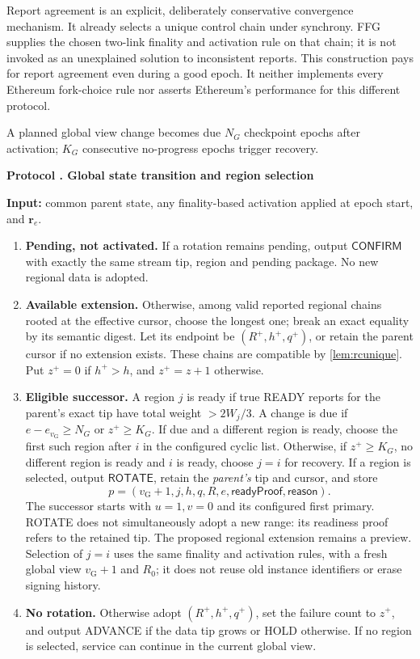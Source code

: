 \documentclass[11pt,a4paper,onecolumn]{article}
\newcommand{\gv}{v_{\mathrm G}}
\newcommand{\Tag}[1]{\mathsf{#1}}
\theoremstyle{remark}\newtheorem{example}[definition]{Example}
\newcounter{protocol}
\newenvironment{protocol}[2]{\refstepcounter{protocol}\label{#1}\begin{mdframed}[nobreak=true,linewidth=.6pt,skipabove=10pt,skipbelow=10pt,innertopmargin=8pt,innerbottommargin=8pt]\small\raggedright\noindent\textbf{Protocol \theprotocol. #2}\par\smallskip}{\end{mdframed}}
\begin{document}
Report agreement is an explicit, deliberately conservative convergence mechanism.
It already selects a unique control chain under synchrony. FFG supplies the
chosen two-link finality and activation rule on that chain; it is not invoked
as an unexplained solution to inconsistent reports. This construction pays for
report agreement even during a good epoch. It neither implements every Ethereum
fork-choice rule nor asserts Ethereum's performance for this different protocol.

A planned global view change becomes due $N_G$ checkpoint epochs after
activation; $K_G$ consecutive no-progress epochs trigger recovery.

\begin{protocol}{alg:gtransition}{Global state transition and region selection}
\textbf{Input:} common parent state, any finality-based activation applied at
epoch start, and $\mathbf r_e$.
\begin{enumerate}[label=\textbf{T\arabic*.}]
\item \textbf{Pending, not activated.} If a rotation remains pending, output
$\Tag{CONFIRM}$ with exactly the same stream tip, region and pending package.
No new regional data is adopted.
\item \textbf{Available extension.} Otherwise, among valid reported regional
chains rooted at the effective cursor, choose the longest one; break an exact
equality by its semantic digest. Let its endpoint be $(R^+,h^+,q^+)$, or retain
the parent cursor if no extension exists. These chains are compatible by
\cref{lem:rcunique}. Put $z^+=0$ if $h^+>h$, and $z^+=z+1$ otherwise.
\item \textbf{Eligible successor.} A region $j$ is ready if true READY
reports for the parent's exact tip have total weight $>2W_j/3$.
A change is due if $e-e_{\gv}\geq N_G$ or $z^+\geq K_G$.
If due and a different region is ready, choose the first such region after $i$
in the configured cyclic list. Otherwise, if $z^+\geq K_G$, no different region
is ready and $i$ is ready, choose $j=i$ for recovery. If a region is selected,
output $\Tag{ROTATE}$, retain the \emph{parent's} tip and cursor, and store
\[
 p=(\gv+1,j,h,q,R,e,\mathsf{readyProof},\mathsf{reason}).
\]
The successor starts with $u=1,v=0$ and its configured first primary. ROTATE does not
simultaneously adopt a new range: its readiness proof refers to the retained tip.
The proposed regional extension remains a preview. Selection of $j=i$ uses
the same finality and activation rules, with a fresh global view $\gv+1$ and $R_0$;
it does not reuse old instance identifiers or erase signing history.
\item \textbf{No rotation.} Otherwise adopt $(R^+,h^+,q^+)$, set the failure
count to $z^+$, and output ADVANCE if the data tip grows or HOLD otherwise.
If no region is selected, service can continue in the current global view.
\end{enumerate}
\end{protocol}
\end{document}
